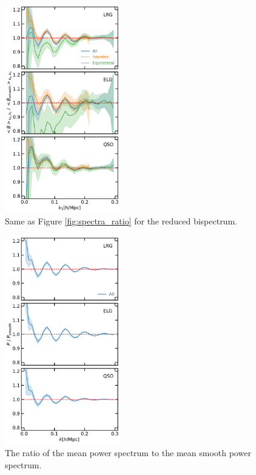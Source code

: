 \begin{figure}
    \centering
    \includegraphics[width=0.45\textwidth]{figures/spectra_ratio_reduced.pdf}
    \caption{Same as Figure \ref{fig:spectra_ratio} for the reduced bispectrum.}
    \label{fig:spectra_ratio_reduced}
\end{figure}


\begin{figure}
    \centering
    \includegraphics[width=0.45\textwidth]{figures/powerspectra_ratio.pdf}
    \caption{The ratio of the mean power spectrum to the mean smooth power spectrum.}
    \label{fig:powerspectra_ratio}
\end{figure}


